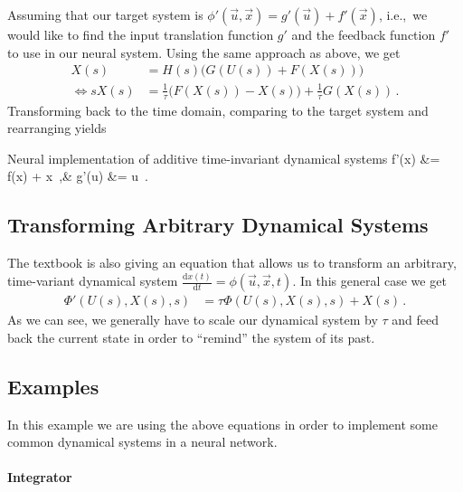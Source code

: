 \documentclass[10pt,letterpaper,oneside]{article}
\begin{document}
Assuming that our target system is $\phi '(\vec u, \vec x) = g'(\vec u) + f'(\vec x)$, i.e.,~we would like to find the input translation function $g'$ and the feedback function $f'$ to use in our neural system. Using the same approach as above, we get
\begin{align*}
	X(s) &= H(s) \big(G(U(s)) + F(X(s))\big) \\
	\Leftrightarrow s X(s) &= \frac{1}{\tau} \big( F(X(s)) - X(s) \big) + \frac{1}{\tau} G(X(s))  \,.
\end{align*}
Transforming back to the time domain, comparing to the target system and rearranging yields
\begin{ImportantEqn}{Neural implementation of additive time-invariant dynamical systems}
	f'(\vec x) &= \tau f(\vec x) + \vec x \,,& g'(\vec u) &= \tau \vec u \,.
	\label{eqn:nef_additive_dyn}
\end{ImportantEqn}


\subsection{Transforming Arbitrary Dynamical Systems}

The textbook is also giving an equation that allows us to transform an arbitrary, time-variant dynamical system $\frac{\mathrm{d}x(t)}{\mathrm{d}t} = \phi(\vec u, \vec x, t)$. In this general case we get
\begin{align*}
	\Phi'(U(s), X(s), s) &= \tau \Phi(U(s), X(s), s) + X(s) \,.
\end{align*}
As we can see, we generally have to scale our dynamical system by $\tau$ and feed back the current state in order to \enquote{remind} the system of its past.

\subsection{Examples}

In this example we are using the above equations in order to implement some common dynamical systems in a neural network.

\paragraph{Integrator}
\end{document}
